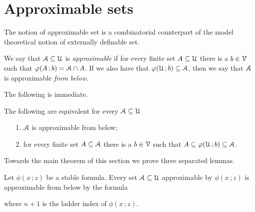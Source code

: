 \documentclass[scombinatorics.tex]{subfiles}
\begin{document}
\section{Approximable sets}

The notion of approximable set is a combinatorial counterpart of the model theoretical notion of externally definable set.

\begin{definition}\label{def_approx}
  We say that $\EuScript A\subseteq\EuScript U$ is \emph{approximable\/} if for every finite set $A\subseteq\EuScript U$ there is a $b\in\EuScript V$ such that $\varphi(A\,;b)=\EuScript A\cap A$.
  If we also have that $\varphi(\EuScript U\,;b)\subseteq\EuScript A$, then we say that $\EuScript A$ is approximable \emph{from below.}\QED
\end{definition}

The following is immediate.

\begin{fact}
  The following are equivalent for every $\EuScript A\subseteq\EuScript U$
  \begin{itemize}
    \item[1.] $\EuScript A$ is approximable from below;
    \item[2.] for every finite set $A\subseteq\EuScript A$ there is a $b\in\EuScript V$ such that $A\subseteq\varphi(\EuScript U\,;b)\subseteq\EuScript A$.\QED
  \end{itemize}
\end{fact}

Towards the main theorem of this section we prove three separated lemmas.

\begin{lemma}
  Let $\phi(x\,;z)$ be a stable formula.
  Every set $\EuScript A\subseteq\EuScript U$ approximable by $\phi(x\,;z)$ is approximable from below by the formula

  
  where $n+1$ is the ladder index of $\phi(x\,;z)$.
\end{lemma}
\end{document}
